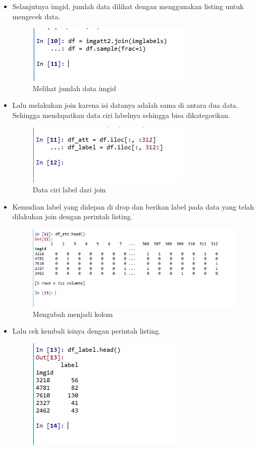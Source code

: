 \begin{enumerate}
\begin{itemize}
		\item Selanjutnya imgid, jumlah data dilihat dengan menggunakan listing untuk mengecek data.
			\begin{figure}[ht]
			\centering
			\includegraphics[scale=0.5]{figures/AIP/ai16.PNG}
			\caption{Melihat jumlah data imgid}
			\label{contoh}
			\end{figure}
		\item Lalu melakukan join karena isi datanya adalah sama di antara dua data. Sehingga mendapatkan data ciri labelnya sehingga bisa dikategorikan.
			\begin{figure}[ht]
			\centering
			\includegraphics[scale=0.5]{figures/AIP/ai17.PNG}
			\caption{Data ciri label dari join}
			\label{contoh}
			\end{figure}
		\item Kemudian label yang didepan di drop dan berikan label pada data yang telah dilakukan join dengan perintah listing.
			\begin{figure}[ht]
			\centering
			\includegraphics[scale=0.5]{figures/AIP/ai18.PNG}
			\caption{Mengubah menjadi kolom}
			\label{contoh}
			\end{figure}
		\item Lalu cek kembali isinya dengan perintah listing. 
			\begin{figure}[ht]
			\centering
			\includegraphics[scale=0.5]{figures/AIP/ai19.PNG}

\end{figure}
\end{itemize}
\end{enumerate}

